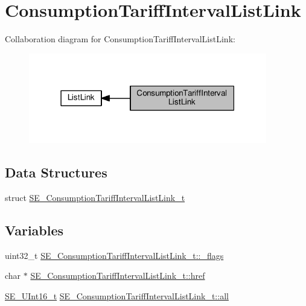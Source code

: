 \hypertarget{group__ConsumptionTariffIntervalListLink}{}\section{Consumption\+Tariff\+Interval\+List\+Link}
\label{group__ConsumptionTariffIntervalListLink}
Collaboration diagram for Consumption\+Tariff\+Interval\+List\+Link\+:\nopagebreak
\begin{figure}[H]
\begin{center}
\leavevmode
\includegraphics[width=295pt]{group__ConsumptionTariffIntervalListLink}
\end{center}
\end{figure}
\subsection*{Data Structures}
\begin{DoxyCompactItemize}
\item 
struct \hyperlink{structSE__ConsumptionTariffIntervalListLink__t}{S\+E\+\_\+\+Consumption\+Tariff\+Interval\+List\+Link\+\_\+t}
\end{DoxyCompactItemize}
\subsection*{Variables}
\begin{DoxyCompactItemize}
\item 
uint32\+\_\+t \hyperlink{group__ConsumptionTariffIntervalListLink_ga5734f32544a524977e599b280236b463}{S\+E\+\_\+\+Consumption\+Tariff\+Interval\+List\+Link\+\_\+t\+::\+\_\+flags}
\item 
char $\ast$ \hyperlink{group__ConsumptionTariffIntervalListLink_ga2f84900778e99a83f0c8294ce3853f9b}{S\+E\+\_\+\+Consumption\+Tariff\+Interval\+List\+Link\+\_\+t\+::href}
\item 
\hyperlink{group__UInt16_gac68d541f189538bfd30cfaa712d20d29}{S\+E\+\_\+\+U\+Int16\+\_\+t} \hyperlink{group__ConsumptionTariffIntervalListLink_gad26eb31b13f0a99cb6ef67fa7adfc193}{S\+E\+\_\+\+Consumption\+Tariff\+Interval\+List\+Link\+\_\+t\+::all}
\end{DoxyCompactItemize}


